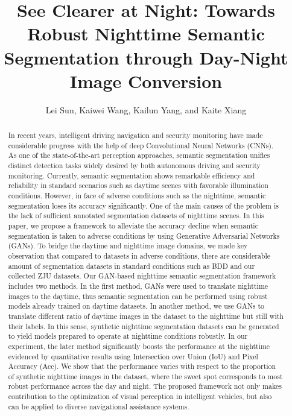 \documentclass[a4paper]{spie}
\title{See Clearer at Night: Towards Robust Nighttime Semantic Segmentation through Day-Night Image Conversion}
\author{Lei Sun, Kaiwei Wang, Kailun Yang, and Kaite Xiang}
\affil{State Key Laboratory of Modern Optical Instrumentation, Zhejiang University, China}
\begin{document}
 
\maketitle

\begin{abstract}
In recent years, intelligent driving navigation and security monitoring have made considerable progress with the help of deep Convolutional Neural Networks (CNNs). As one of the state-of-the-art perception approaches, semantic segmentation unifies distinct detection tasks widely desired by both autonomous driving and security monitoring. Currently, semantic segmentation shows remarkable efficiency and reliability in standard scenarios such as daytime scenes with favorable illumination conditions. However, in face of adverse conditions such as the nighttime, semantic segmentation loses its accuracy significantly. One of the main causes of the problem is the lack of sufficient annotated segmentation datasets of nighttime scenes. In this paper, we propose a framework to alleviate the accuracy decline when semantic segmentation is taken to adverse conditions by using Generative Adversarial Networks (GANs). To bridge the daytime and nighttime image domains, we made key observation that compared to datasets in adverse conditions, there are considerable amount of segmentation datasets in standard conditions such as BDD and our collected ZJU datasets. Our GAN-based nighttime semantic segmentation framework includes two methods. In the first method, GANs were used to translate nighttime images to the daytime, thus semantic segmentation can be performed using robust models already trained on daytime datasets. In another method, we use GANs to translate different ratio of daytime images in the dataset to the nighttime but still with their labels. In this sense, synthetic nighttime segmentation datasets can be generated to yield models prepared to operate at nighttime conditions robustly. In our experiment, the later method significantly boosts the performance at the nighttime evidenced by quantitative results using Intersection over Union (IoU) and Pixel Accuracy (Acc). We show that the performance varies with respect to the proportion of synthetic nighttime images in the dataset, where the sweet spot corresponds to most robust performance across the day and night. The proposed framework not only makes contribution to the optimization of visual perception in intelligent vehicles, but also can be applied to diverse navigational assistance systems.
\end{abstract}
\end{document}

